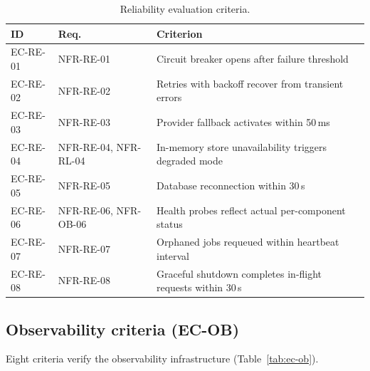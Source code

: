 \documentclass[a4paper,noexaminfo]{sapthesis}
\begin{document}
\begin{table}[ht]
\centering
\caption{Reliability evaluation criteria.}
\label{tab:ec-re}
\small
\begin{tabularx}{\textwidth}{@{}l l X@{}}
    \hline
    \textbf{ID} & \textbf{Req.} & \textbf{Criterion} \\
    \hline
    EC-RE-01 & NFR-RE-01 & Circuit breaker opens after failure
        threshold \\
    EC-RE-02 & NFR-RE-02 & Retries with backoff recover from transient
        errors \\
    EC-RE-03 & NFR-RE-03 & Provider fallback activates within
        50\,ms \\
    EC-RE-04 & NFR-RE-04, NFR-RL-04 & In-memory store unavailability
        triggers degraded mode \\
    EC-RE-05 & NFR-RE-05 & Database reconnection within 30\,s \\
    EC-RE-06 & NFR-RE-06, NFR-OB-06 & Health probes reflect actual
        per-component status \\
    EC-RE-07 & NFR-RE-07 & Orphaned jobs requeued within heartbeat
        interval \\
    EC-RE-08 & NFR-RE-08 & Graceful shutdown completes in-flight
        requests within 30\,s \\
    \hline
\end{tabularx}
\end{table}

\subsection{Observability criteria (EC-OB)}

Eight criteria verify the observability infrastructure
(Table~\ref{tab:ec-ob}).
\end{document}
